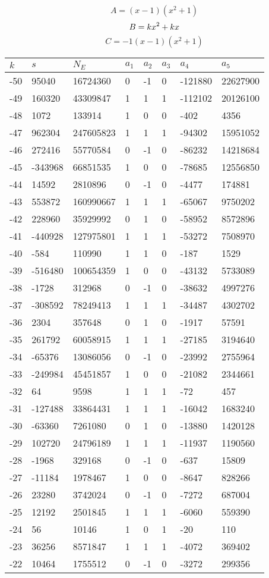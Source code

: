 \documentclass{amsart}
\begin{document}
$$A=(x
 - 1)(x^2
 + 1)$$
$$B=k\*x^2
 + k\*x$$
$$C=-1(x
 - 1)(x^2
 + 1)$$
\begin{longtable}{|l|l|l|lllll|}
\hline
$k$ & $s$ & $N_E$ & $a_1$ & $a_2$ & $a_3$ & $a_4$ & $a_5$\\
\hline
-50&95040&16724360&0&-1&0&-121880&22627900\\
-49&160320&43309847&1&1&1&-112102&20126100\\
-48&1072&133914&1&0&0&-402&4356\\
-47&962304&247605823&1&1&1&-94302&15951052\\
-46&272416&55770584&0&-1&0&-86232&14218684\\
-45&-343968&66851535&1&0&0&-78685&12556850\\
-44&14592&2810896&0&-1&0&-4477&174881\\
-43&553872&160990667&1&1&1&-65067&9750202\\
-42&228960&35929992&0&1&0&-58952&8572896\\
-41&-440928&127975801&1&1&1&-53272&7508970\\
-40&-584&110990&1&1&0&-187&1529\\
-39&-516480&100654359&1&0&0&-43132&5733089\\
-38&-1728&312968&0&-1&0&-38632&4997276\\
-37&-308592&78249413&1&1&1&-34487&4302702\\
-36&2304&357648&0&1&0&-1917&57591\\
-35&261792&60058915&1&1&1&-27185&3194640\\
-34&-65376&13086056&0&-1&0&-23992&2755964\\
-33&-249984&45451857&1&0&0&-21082&2344661\\
-32&64&9598&1&1&1&-72&457\\
-31&-127488&33864431&1&1&1&-16042&1683240\\
-30&-63360&7261080&0&1&0&-13880&1420128\\
-29&102720&24796189&1&1&1&-11937&1190560\\
-28&-1968&329168&0&-1&0&-637&15809\\
-27&-11184&1978467&1&0&0&-8647&828266\\
-26&23280&3742024&0&-1&0&-7272&687004\\
-25&12192&2501845&1&1&1&-6060&559390\\
-24&56&10146&1&0&1&-20&110\\
-23&36256&8571847&1&1&1&-4072&369402\\
-22&10464&1755512&0&-1&0&-3272&299356\\

\end{longtable}
\end{document}
